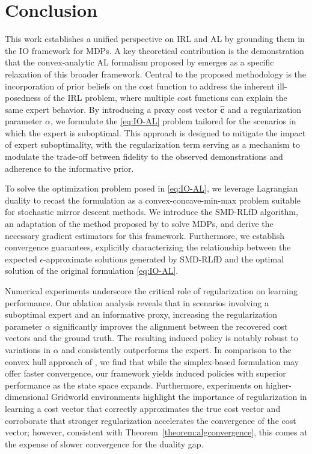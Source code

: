 \documentclass[10pt]{article} %
\def\vc{{\bm{c}}}
\begin{document}
\section{Conclusion}
This work establishes a unified perspective on IRL and AL by grounding them in the IO framework for MDPs. A key theoretical contribution is the demonstration that the convex-analytic AL formalism proposed by \cite{Kamoutsi2021} emerges as a specific relaxation of this broader framework. Central to the proposed methodology is the incorporation of prior beliefs on the cost function to address the inherent ill-posedness of the IRL problem, where multiple cost functions can explain the same expert behavior. By introducing a proxy cost vector $\hat{\vc}$ and a regularization parameter $\alpha$, we formulate the \eqref{eq:IO-AL} problem tailored for the scenarios in which the expert is suboptimal. This approach is designed to mitigate the impact of expert suboptimality, with the regularization term serving as a mechanism to modulate the trade-off between fidelity to the observed demonstrations and adherence to the informative prior.

To solve the optimization problem posed in \eqref{eq:IO-AL}, we leverage Lagrangian duality to recast the formulation as a convex-concave-min-max problem suitable for stochastic mirror descent methods. We introduce the SMD-RLfD algorithm, an adaptation of the method proposed by \cite{Jin2020} to solve MDPs, and derive the necessary gradient estimators for this framework. Furthermore, we establish convergence guarantees, explicitly characterizing the relationship between the expected $\epsilon$-approximate solutions generated by SMD-RLfD and the optimal solution of the original formulation \eqref{eq:IO-AL}.

Numerical experiments underscore the critical role of regularization on learning performance. Our ablation analysis reveals that in scenarios involving a suboptimal expert and an informative proxy, increasing the regularization parameter $\alpha$ significantly improves the alignment between the recovered cost vectors and the ground truth. The resulting induced policy is notably robust to variations in $\alpha$ and consistently outperforms the expert. In comparison to the convex hull approach of \citet{Kamoutsi2021}, we find that while the simplex-based formulation may offer faster convergence, our framework yields induced policies with superior performance as the state space expands. Furthermore, experiments on higher-dimensional Gridworld environments highlight the importance of regularization in learning a cost vector that correctly approximates the true cost vector and corroborate that stronger regularization accelerates the convergence of the cost vector; however, consistent with Theorem~\ref{theorem:algconvergence}, this comes at the expense of slower convergence for the duality gap.
\end{document}
